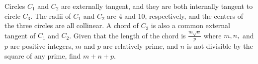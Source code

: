 Circles $C_1$ and $C_2$ are externally tangent, and they are both internally tangent to circle $C_3$. The radii of $C_1$ and $C_2$ are $4$ and $10$, respectively, and the centers of the three circles are all collinear. A chord of $C_3$ is also a common external tangent of $C_1$ and $C_2$. Given that the length of the chord is $\frac{m\sqrt{n}}{p}$ where $m,n,$ and $p$ are positive integers, $m$ and $p$ are relatively prime, and $n$ is not divisible by the square of any prime, find $m+n+p$.